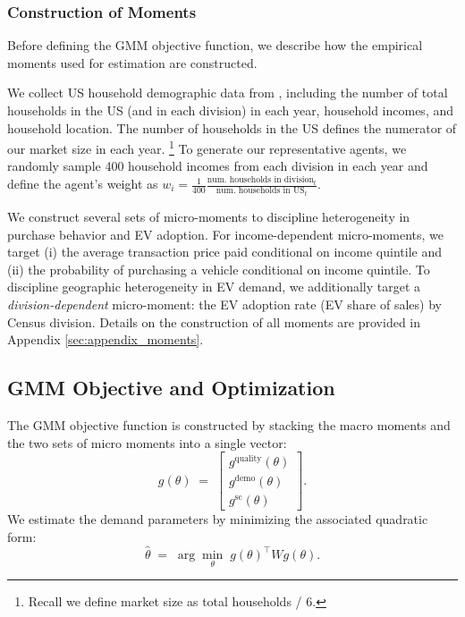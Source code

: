 \documentclass[11pt]{article}
\begin{document}
\subsubsection{Construction of Moments}

Before defining the GMM objective function, we describe how the empirical moments used for estimation are constructed.

We collect US household demographic data from \cite{ruggles_ipums_2025}, including the number of total households in the US (and in each division) in each year, household incomes, and household location. The number of households in the US defines the numerator of our market size in each year. \footnote{Recall we define market size as total households / 6.} To generate our representative agents, we randomly sample 400 household incomes from each division in each year and define the agent's weight as $w_i = \frac{1}{400}\frac{\text{num. households in division}_t}{\text{num. households in US}_t}$.

We construct several sets of micro-moments to discipline heterogeneity in purchase behavior and EV adoption. For income-dependent micro-moments, we target (i) the average transaction price paid conditional on income quintile and (ii) the probability of purchasing a vehicle conditional on income quintile. To discipline geographic heterogeneity in EV demand, we additionally target a \textit{division-dependent} micro-moment: the EV adoption rate (EV share of sales) by Census division. Details on the construction of all moments are provided in Appendix \ref{sec:appendix_moments}.

\subsection{GMM Objective and Optimization}
The GMM objective function is constructed by stacking the macro moments and the two sets of micro moments into a single vector:
\begin{equation}
g(\theta)
\;=\;
\begin{bmatrix}
g^{\text{quality}}(\theta) \\
g^{\text{demo}}(\theta) \\
g^{\text{sc}}(\theta)
\end{bmatrix}.
\end{equation}
We estimate the demand parameters by minimizing the associated quadratic form:
\begin{equation}
\hat{\theta}
\;=\;
\arg\min_{\theta}
\;
g(\theta)^{\top} W g(\theta).
\end{equation}
\end{document}
